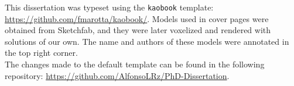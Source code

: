 \vspace*{\fill}
\normalsize 
This dissertation was typeset using the \verb|kaobook| template: \url{https://github.com/fmarotta/kaobook/}. Models used in cover pages were obtained from Sketchfab, and they were later voxelized and rendered with solutions of our own. The name and authors of these models were annotated in the top right corner. \\

The changes made to the default template can be found in the following repository: \url{https://github.com/AlfonsoLRz/PhD-Dissertation}.
\normalsize